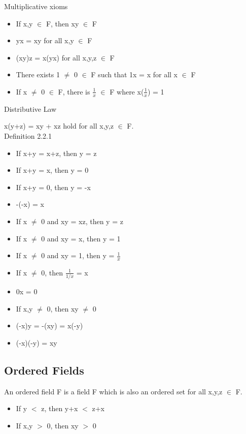 Multiplicative xioms
\begin{itemize}[leftmargin=2cm]
	\item If x,y $\in$ F, then xy $\in$ F
	\item yx = xy for all x,y $\in$ F
	\item (xy)z = x(yx) for all x,y,z $\in$ F
	\item There exists 1 $\not =$ 0 $\in$ F such that 1x = x for all x $\in$ F
	\item If x $\not =$ 0 $\in$ F, there is $\frac{1}{x}$ $\in$ F where x($\frac{1}{x}$) = 1
\end{itemize}

Distributive Law

\qquad x(y+z) = xy + xz hold for all x,y,z $\in$ F. \\

{ \color{blue} Definition 2.2.1 }
\begin{itemize}[leftmargin=2cm]
	\item If x+y = x+z, then y = z
	\item If x+y = x, then y = 0
	\item If x+y = 0, then y = -x
	\item -(-x) = x
	\item If x $\not =$ 0 and xy = xz, then y = z
	\item If x $\not =$ 0 and xy = x, then y = 1
	\item If x $\not =$ 0 and xy = 1, then y = $\frac{1}{x}$
	\item If x $\not =$ 0, then $\frac{1}{1/x}$ = x
	\item 0x = 0
	\item If x,y $\not =$ 0, then xy $\not =$ 0
	\item (-x)y = -(xy) = x(-y)
	\item (-x)(-y) = xy
\end{itemize}





\subsection{Ordered Fields}

\qquad An ordered field F is a field F which is also an ordered set for all x,y,z $\in$ F.

\begin{itemize}[leftmargin=2cm]
	\item If y $<$ z, then y+x $<$ z+x
	\item If x,y $>$ 0, then xy $>$ 0
\end{itemize}

